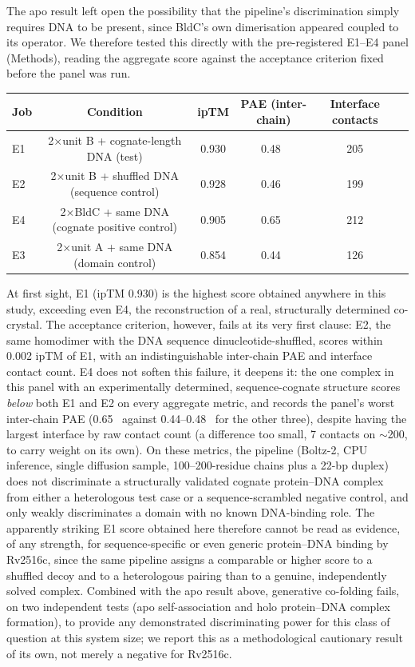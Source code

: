 \documentclass[11pt,a4paper]{article}
\newcommand{\ang}{\text{\AA}}
\begin{document}
The apo result left open the possibility that the pipeline's discrimination simply requires DNA to
be present, since BldC's own dimerisation appeared coupled to its operator. We therefore tested this
directly with the pre-registered E1--E4 panel (Methods), reading the aggregate score against the
acceptance criterion fixed before the panel was run.
\begin{center}
\small
\begin{tabular}{@{}lccccc@{}}
\toprule
Job & Condition & ipTM & PAE (inter-chain) & Interface contacts \\
\midrule
E1 & 2$\times$unit B + cognate-length DNA (test) & 0.930 & 0.48~\ang{} & 205 \\
E2 & 2$\times$unit B + shuffled DNA (sequence control) & 0.928 & 0.46~\ang{} & 199 \\
E4 & 2$\times$BldC + same DNA (cognate positive control) & 0.905 & 0.65~\ang{} & 212 \\
E3 & 2$\times$unit A + same DNA (domain control) & 0.854 & 0.44~\ang{} & 126 \\
\bottomrule
\end{tabular}
\end{center}
At first sight, E1 (ipTM 0.930) is the highest score obtained anywhere in this study, exceeding even
E4, the reconstruction of a real, structurally determined co-crystal. The acceptance criterion,
however, fails at its very first clause: E2, the same homodimer with the DNA sequence
dinucleotide-shuffled, scores within 0.002 ipTM of E1, with an indistinguishable inter-chain PAE and
interface contact count. E4 does not soften this failure, it deepens it: the one complex in this
panel with an experimentally determined, sequence-cognate structure scores \emph{below} both E1 and
E2 on every aggregate metric, and records the panel's worst inter-chain PAE (0.65~\ang{} against
0.44--0.48~\ang{} for the other three), despite having the largest interface by raw contact count
(a difference too small, 7 contacts on $\sim$200, to carry weight on its own). On these metrics, the
pipeline (Boltz-2, CPU inference, single diffusion sample, 100--200-residue chains plus a 22-bp
duplex) does not discriminate a structurally validated cognate protein--DNA complex from either a
heterologous test case or a sequence-scrambled negative control, and only weakly discriminates a
domain with no known DNA-binding role. The apparently striking E1 score obtained here therefore
cannot be read as evidence, of any strength, for sequence-specific or even generic protein--DNA
binding by Rv2516c, since the same pipeline assigns a comparable or higher score to a shuffled decoy
and to a heterologous pairing than to a genuine, independently solved complex. Combined with the apo
result above, generative co-folding fails, on two independent tests (apo self-association and holo
protein--DNA complex formation), to provide any demonstrated discriminating power for this class of
question at this system size; we report this as a methodological cautionary result of its own, not
merely a negative for Rv2516c.
\end{document}

